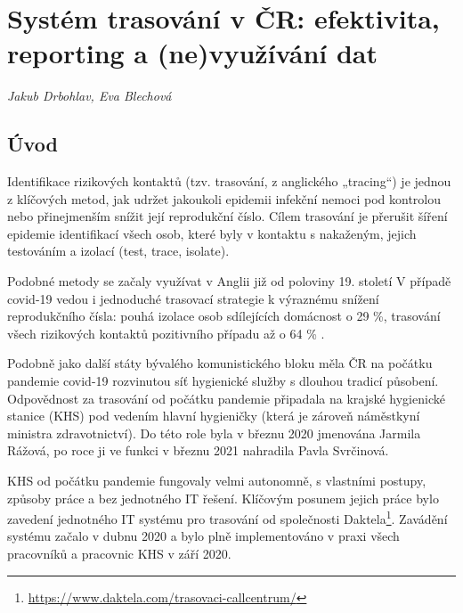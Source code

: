 \chapter[Systém trasování v ČR]{Systém trasování v ČR: efektivita, reporting a (ne)využívání dat}\label{Trasovani}

\textit{Jakub Drbohlav, Eva Blechová}
\vspace{15mm}

\section*{Úvod}

Identifikace rizikových kontaktů (tzv. trasování, z anglického „tracing“) je jednou z klíčových metod, jak udržet jakoukoli epidemii infekční nemoci pod kontrolou nebo přinejmenším snížit její reprodukční číslo. Cílem trasování je přerušit šíření epidemie identifikací všech osob, které byly v kontaktu s nakaženým, jejich testováním a izolací (test, trace, isolate).

Podobné metody se začaly využívat v Anglii již od poloviny 19. století \cite{pg:mooney2020} V případě covid-19 vedou i jednoduché trasovací strategie k výraznému snížení reprodukčního čísla: pouhá izolace osob sdílejících domácnost o 29 \%, trasování všech rizikových kontaktů pozitivního případu až o 64 \% \cite{pg:kucharski2020}.

Podobně jako další státy bývalého komunistického bloku měla ČR na počátku pandemie covid-19 rozvinutou síť hygienické služby s dlouhou tradicí působení. Odpovědnost za trasování od počátku pandemie připadala na krajské hygienické stanice (KHS) pod vedením hlavní hygieničky (která je zároveň náměstkyní ministra zdravotnictví). Do této role byla v březnu 2020 jmenována Jarmila Rážová, po roce ji ve funkci v březnu 2021 nahradila Pavla Svrčinová.

KHS od počátku pandemie fungovaly velmi autonomně, s vlastními postupy, způsoby práce a bez jednotného IT řešení. Klíčovým posunem jejich práce bylo zavedení jednotného IT systému pro trasování od společnosti Daktela\footnote{\url{https://www.daktela.com/trasovaci-callcentrum/}}. Zavádění systému začalo v dubnu 2020 a bylo plně implementováno v praxi všech pracovníků a pracovnic KHS v září 2020.

